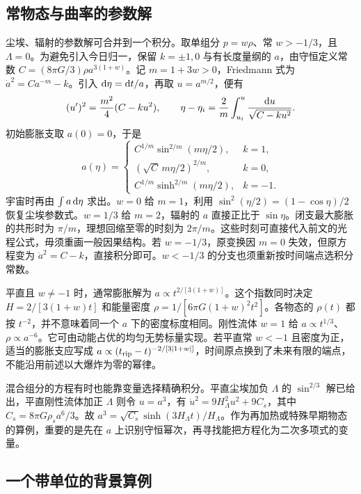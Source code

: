 \subsection{常物态与曲率的参数解}

尘埃、辐射的参数解可合并到一个积分。取单组分 $p=w\rho$、常 $w>-1/3$，且 $\Lambda=0$。为避免引入今日归一，保留 $k=\pm1,0$ 与有长度量纲的 $a$，由守恒定义常数 $C=(8\pi G/3)\rho a^{3(1+w)}$。记 $m=1+3w>0$，Friedmann 式为 $\dot a^2=Ca^{-m}-k$。引入 $\dd\eta=\dd t/a$，再取 $u=a^{m/2}$，便有
\[
 (u')^2=\frac{m^2}{4}(C-ku^2),\qquad
 \eta-\eta_i=\frac2m\int_{u_i}^{u}\frac{\dd u}{\sqrt{C-ku^2}} .
\]
初始膨胀支取 $a(0)=0$，于是
\[
 a(\eta)=
 \begin{cases}
 C^{1/m}\sin^{2/m}(m\eta/2),&k=1,\\
 (\sqrt C\,m\eta/2)^{2/m},&k=0,\\
 C^{1/m}\sinh^{2/m}(m\eta/2),&k=-1.
 \end{cases}
\]
宇宙时再由 $\int a\,\dd\eta$ 求出。$w=0$ 给 $m=1$，利用 $\sin^2(\eta/2)=(1-\cos\eta)/2$ 恢复尘埃参数式。$w=1/3$ 给 $m=2$，辐射的 $a$ 直接正比于 $\sin\eta$。闭支最大膨胀的共形时为 $\pi/m$，理想回缩至零的时刻为 $2\pi/m$。这些时刻可直接代入前文的光程公式，毋须重画一般因果结构。若 $w=-1/3$，原变换因 $m=0$ 失效，但原方程变为 $\dot a^2=C-k$，直接积分即可。$w<-1/3$ 的分支也须重新按时间端点选积分常数。

平直且 $w\ne-1$ 时，通常膨胀解为 $a\propto t^{2/[3(1+w)]}$。这个指数同时决定 $H=2/[3(1+w)t]$ 和能量密度 $\rho=1/[6\pi G(1+w)^2t^2]$。各物态的 $\rho(t)$ 都按 $t^{-2}$，并不意味着同一个 $a$ 下的密度标度相同。刚性流体 $w=1$ 给 $a\propto t^{1/3}$、$\rho\propto a^{-6}$。它可由动能占优的均匀无势标量实现。若平直常 $w<-1$ 且密度为正，适当的膨胀支应写成 $a\propto(t_{\rm rip}-t)^{-2/[3|1+w|]}$，时间原点换到了未来有限的端点，不能沿用前述以大爆炸为零的幂律。

混合组分的方程有时也能靠变量选择精确积分。平直尘埃加负 $\Lambda$ 的 $\sin^{2/3}$ 解已给出，平直刚性流体加正 $\Lambda$ 则令 $u=a^3$，有 $\dot u^2=9H_\Lambda^2u^2+9C_s$，其中 $C_s=8\pi G\rho_s a^6/3$。故 $a^3=\sqrt{C_s}\sinh(3H_\Lambda t)/H_\Lambda$。作为再加热或特殊早期物态的算例，重要的是先在 $a$ 上识别守恒幂次，再寻找能把方程化为二次多项式的变量。

\subsection{一个带单位的背景算例}


